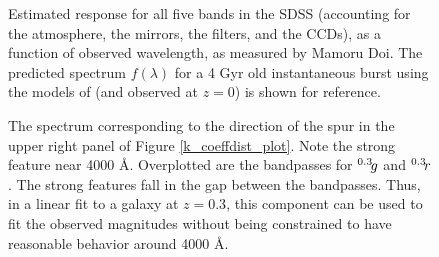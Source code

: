 \clearpage

\setcounter{thefigs}{0}

\clearpage
{}
\begin{figure}
\figurenum{\fignum}
\caption{\label{response_sdss} Estimated response for all five bands
in the SDSS (accounting for the atmosphere, the mirrors, the filters,
and the CCDs), as a function of observed wavelength, as measured by
Mamoru Doi. The predicted spectrum $f(\lambda)$ for a 4 Gyr old
instantaneous burst using the models of \citet{bruzual93a} (and
observed at $z=0$) is shown for reference.}
\end{figure}

\clearpage
{}
\begin{figure}
\figurenum{\fignum}
\caption{\label{spur} The spectrum corresponding to the direction of
the spur in the upper right panel of Figure
\ref{k_coeffdist_plot}. Note the strong feature near 4000
\AA. Overplotted are the bandpasses for $^{{0.3}}\!{g}$ and
$^{{0.3}}\!{r}$. The strong features fall in the gap between the
bandpasses. Thus, in a linear fit to a galaxy at $z=0.3$, this
component can be used to fit the observed magnitudes without being
constrained to have reasonable behavior around 4000 \AA. }
\end{figure}


